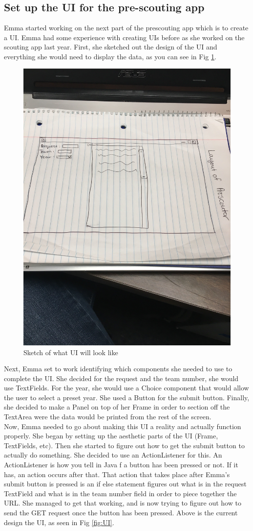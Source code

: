 \documentclass{article}
\begin{document}
\subsection{Set up the UI for the pre-scouting app}
Emma started working on the next part of the prescouting app which is to create a UI. Emma had some experience with creating UIs before as she worked on the scouting app last year. First, she sketched out the design of the UI and everything she would need to display the data, as you can see in Fig \ref{fig:sketch}. \\

\begin{figure}
    \centering
    \includegraphics[width=.6 \textwidth]{24_02-11/images/sketchofUI.JPG}
    \caption{Sketch of what UI will look like}
    \label{fig:sketch}
\end{figure}

Next, Emma set to work identifying which components she needed to use to complete the UI. She decided for the request and the team number, she would use TextFields. For the year, she would use a Choice component that would allow the user to select a preset year. She used a Button for the submit button. Finally, she decided to make a Panel on top of her Frame in order to section off the TextArea were the data would be printed from the rest of the screen. \\

Now, Emma needed to go about making this UI a reality and actually function properly. She began by setting up the aesthetic parts of the UI (Frame, TextFields, etc). Then she started to figure out how to get the submit button to actually do something. She decided to use an ActionListener for this. An ActionListener is how you tell in Java f a button has been pressed or not. If it has, an action occurs after that. That action that takes place after Emma's submit button is pressed is an if else statement figures out what is in the request TextField and what is in the team number field in order to piece together the URL. She managed to get that working, and is now trying to figure out how to send the GET request once the button has been pressed. Above is the current design the UI, as seen in Fig \ref{fig:UI}.
\end{document}
